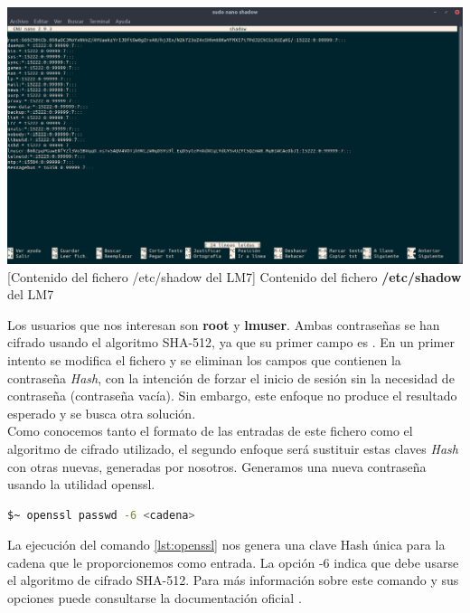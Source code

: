 \begin{center}
    \includegraphics[scale=0.25]{imagenes/shadow.png}
    [Contenido del fichero /etc/shadow del LM7]
    {Contenido del fichero \textbf{/etc/shadow} del \gls{LM7}}
    \label{img:shadow}
\end{center}

Los usuarios que nos interesan son \textbf{root} y \textbf{lmuser}. Ambas contraseñas se han cifrado usando el algoritmo SHA-512, ya que su primer campo es \textdollar. En un primer intento se modifica el fichero y se eliminan los campos que contienen la contraseña \textit{Hash}, con la intención de forzar el inicio de sesión sin la necesidad de contraseña (contraseña vacía). Sin embargo, este enfoque no produce el resultado esperado y se busca otra solución. \\ Como conocemos tanto el formato de las entradas de este fichero como el algoritmo de cifrado utilizado, el segundo enfoque será sustituir estas claves \textit{Hash} con otras nuevas, generadas por nosotros. Generamos una nueva contraseña usando la utilidad \gls{openssl}.
\newpage

\begin{lstlisting}[language=bash, label={lst:openssl}, caption={Generación de Hash usando cifrado SHA-512}]
    $~ openssl passwd -6 <cadena>
\end{lstlisting}

La ejecución del comando \ref{lst:openssl} nos genera una clave Hash única para la cadena que le proporcionemos como entrada. La opción -6 indica que debe usarse el algoritmo de cifrado SHA-512. Para más información sobre este comando y sus opciones puede consultarse la documentación oficial \cite{openssl}.

